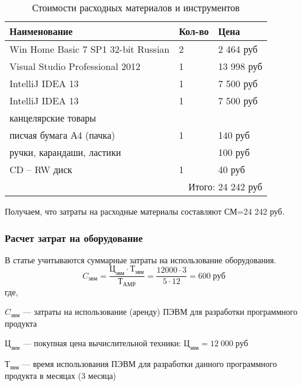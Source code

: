 \renewcommand{\arraystretch}{1.4} %
\begin{table}[!htb]
	\caption{Стоимости расходных материалов и инструментов}\label{tab:a}
    \centering
        \begin{tabular}{|l|l|l|}
        		\hline
        		Наименование & Кол-во & Цена \\
        		\hline
        		Win Home Basic 7 SP1 32-bit Russian & 2 & 2 464 руб \\
        		\hline
        		Visual Studio Professional 2012 & 1 & 13 998 руб\\
        		\hline
        		IntelliJ IDEA 13 & 1 & 7 500 руб\\ 
        		\hline
        		IntelliJ IDEA 13 & 1 & 7 500 руб\\ 
        		\hline
        		\multicolumn{3}{|l|}{канцелярские товары}\\
        		\hline
        		писчая бумага А4 (пачка) & 1 & 140 руб\\
        		\hline
        		ручки, карандаши, ластики &   & 100 руб\\
        		\hline
        		CD – RW диск & 1 & 40 руб\\
        		\hline
        		\multicolumn{3}{|r|}{Итого: 24 242 руб }\\
        		\hline
        \end{tabular}
    		
\end{table}

Получаем, что  затраты на расходные материалы составляют 
СМ=24 242 руб.


\subsubsection{Расчет затрат на оборудование}

В статье учитываются суммарные затраты на использование оборудования.
$$ 
C_{эвм}=
\frac{Ц_{эвм} \cdot Т_{эвм}}{Т_{АМР}} =
\frac{12 000 \cdot 3}{5 \cdot 12} = 
600 \; руб
$$
где, 

$C_{эвм}$ — затраты на использование (аренду) ПЭВМ для разработки программного продукта

$Ц_{эвм}$ — покупная цена вычислительной техники: $Ц_{эвм} = 12 \; 000 \; руб$

$Т_{эвм}$ — время использования ПЭВМ для разработки данного программного продукта в месяцах (3 месяца)

